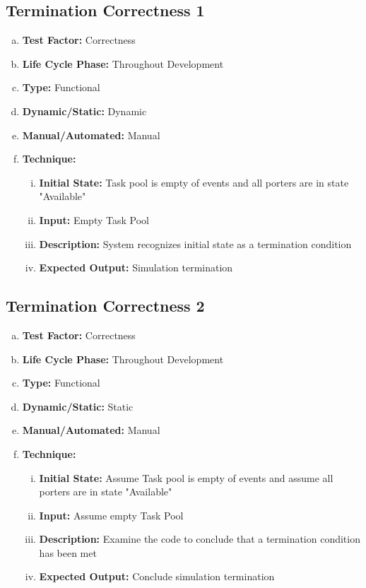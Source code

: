 \documentclass[paper=letter, fontsize=10pt]{scrartcl}
\numberwithin{equation}{section}		%
\numberwithin{figure}{section}			%
\numberwithin{table}{section}				%
\begin{document}
\subsection{Termination Correctness 1}
\begin{enumerate}[(a)]
	\item \textbf{Test Factor:} Correctness
	\item \textbf{Life Cycle Phase:} Throughout Development
	\item \textbf{Type:} Functional
	\item \textbf{Dynamic/Static:} Dynamic
	\item \textbf{Manual/Automated:} Manual
	\item \textbf{Technique:}
		\begin{enumerate}[(i)]
			\item \textbf{Initial State:} Task pool is empty of events and all porters are in state "Available"  
			\item \textbf{Input:} Empty Task Pool
			\item \textbf{Description:} System recognizes initial state as a termination condition
			\item \textbf{Expected Output:} Simulation termination
		\end{enumerate}
\end{enumerate}

\subsection{Termination Correctness 2}
\begin{enumerate}[(a)]
	\item \textbf{Test Factor:} Correctness
	\item \textbf{Life Cycle Phase:} Throughout Development
	\item \textbf{Type:} Functional
	\item \textbf{Dynamic/Static:} Static
	\item \textbf{Manual/Automated:} Manual
	\item \textbf{Technique:}
		\begin{enumerate}[(i)]
			\item \textbf{Initial State:} Assume Task pool is empty of events and assume all porters are in state "Available"  
			\item \textbf{Input:}  Assume empty Task Pool
			\item \textbf{Description:} Examine the code to conclude that a termination condition has been met 
			\item \textbf{Expected Output:} Conclude simulation termination
		\end{enumerate}
\end{enumerate}
\end{document}
